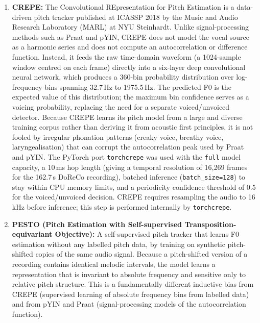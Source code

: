 \begin{enumerate}
\item \textbf{CREPE:} The Convolutional REpresentation for Pitch Estimation
      \cite{kim2018crepe} is a data-driven pitch tracker published at ICASSP 2018
      by the Music and Audio Research Laboratory (MARL) at NYU Steinhardt. Unlike
      signal-processing methods such as Praat and pYIN, CREPE does not model the
      vocal source as a harmonic series and does not compute an autocorrelation or
      difference function. Instead, it feeds the raw time-domain waveform (a
      1024-sample window centred on each frame) directly into a six-layer deep
      convolutional neural network, which produces a 360-bin probability
      distribution over log-frequency bins spanning 32.7\,Hz to 1975.5\,Hz. The
      predicted F0 is the expected value of this distribution; the maximum bin
      confidence serves as a voicing probability, replacing the need for a
      separate voiced/unvoiced detector. Because CREPE learns its pitch model
      from a large and diverse training corpus rather than deriving it from
      acoustic first principles, it is not fooled by irregular phonation patterns
      (creaky voice, breathy voice, laryngealisation) that can corrupt the
      autocorrelation peak used by Praat and pYIN. The PyTorch port
      \texttt{torchcrepe} \cite{morrisonTorchcrepe} was used with the
      \texttt{full} model capacity, a 10\,ms hop length (giving a temporal
      resolution of 16,269 frames for the 162.7\,s DoReCo recording), batched
      inference (\texttt{batch\_size=128}) to stay within CPU memory limits, and a
      periodicity confidence threshold of 0.5 for the voiced/unvoiced decision.
      CREPE requires resampling the audio to 16\,kHz before inference; this step
      is performed internally by \texttt{torchcrepe}.


\item \textbf{PESTO (Pitch Estimation with Self-supervised Transposition-equivariant
      Objective):} A self-supervised pitch tracker \cite{riou2023pesto} that learns
      F0 estimation without any labelled pitch data, by training on synthetic
      pitch-shifted copies of the same audio signal. Because a pitch-shifted version
      of a recording contains identical melodic intervals, the model learns a
      representation that is invariant to absolute frequency and sensitive only to
      relative pitch structure. This is a fundamentally different inductive bias from
      CREPE (supervised learning of absolute frequency bins from labelled data) and
      from pYIN and Praat (signal-processing models of the autocorrelation function).


\end{enumerate}
